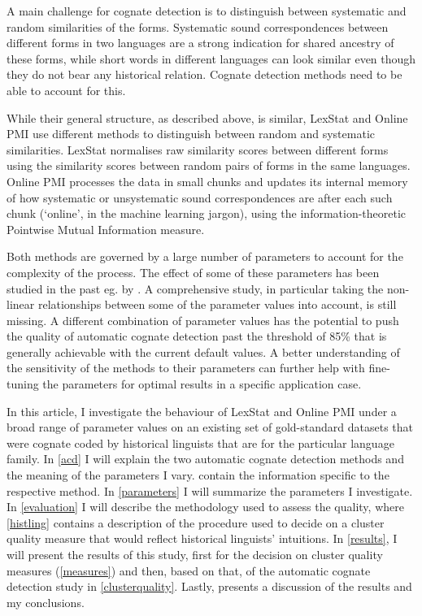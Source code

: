 \documentclass[a4paper,11pt,twocolumn]{scrartcl}
\begin{document}
A main challenge for cognate detection is to distinguish between systematic and random similarities of the forms. Systematic sound correspondences between different forms in two languages are a strong indication for shared ancestry of these forms, while short words in different languages can look similar even though they do not bear any historical relation. Cognate detection methods need to be able to account for this.

While their general structure, as described above, is similar, LexStat and Online PMI use different methods to distinguish between random and systematic similarities. LexStat normalises raw similarity scores between different forms using the similarity scores between random pairs of forms in the same languages. Online PMI processes the data in small chunks and updates its internal memory of how systematic or unsystematic sound correspondences are after each such chunk (‘online’, in the machine learning jargon), using the information-theoretic Pointwise Mutual Information measure.

Both methods are governed by a large number of parameters to account for the complexity of the process. The effect of some of these parameters has been studied in the past eg. by \textcite{list2017potential}. A comprehensive study, in particular taking the non-linear relationships between some of the parameter values into account, is still missing. A different combination of parameter values has the potential to push the quality of automatic cognate detection past the threshold of 85\% that is generally achievable with the current default values. A better understanding of the sensitivity of the methods to their parameters can further help with fine-tuning the parameters for optimal results in a specific application case.

In this article, I investigate the behaviour of LexStat and Online PMI under a
broad range of parameter values on an existing set of gold-standard datasets
that were cognate coded by historical linguists that are for the particular
language family. In \cref{acd} I will explain the two automatic cognate
detection methods and the meaning of the parameters I vary.
 contain the information specific to the respective
method. In \cref{parameters} I will summarize the parameters I investigate. In
\cref{evaluation} I will describe the methodology used to assess the quality,
where \cref{histling} contains a description of the procedure used to decide on
a cluster quality measure that would reflect historical linguists' intuitions.
In \cref{results}, I will present the results of this study, first for the
decision on cluster quality measures (\cref{measures}) and then, based on that,
of the automatic cognate detection study in \cref{clusterquality}. Lastly,
 presents a discussion of the results and my conclusions.
\end{document}
